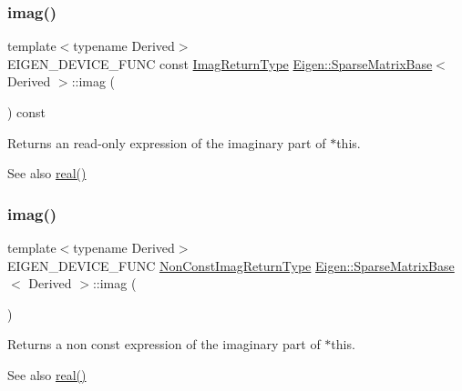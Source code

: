 \subsubsection{\texorpdfstring{imag()}{imag()}\hspace{0.1cm}{\footnotesize\ttfamily [1/2]}}
{\footnotesize\ttfamily template$<$typename Derived$>$ \\
E\+I\+G\+E\+N\+\_\+\+D\+E\+V\+I\+C\+E\+\_\+\+F\+U\+NC const \mbox{\hyperlink{class_eigen_1_1_cwise_unary_op}{Imag\+Return\+Type}} \mbox{\hyperlink{class_eigen_1_1_sparse_matrix_base}{Eigen\+::\+Sparse\+Matrix\+Base}}$<$ Derived $>$\+::imag (\begin{DoxyParamCaption}{ }\end{DoxyParamCaption}) const\hspace{0.3cm}{\ttfamily [inline]}}

\begin{DoxyReturn}{Returns}
an read-\/only expression of the imaginary part of {\ttfamily $\ast$this}.
\end{DoxyReturn}
\begin{DoxySeeAlso}{See also}
\mbox{\hyperlink{class_eigen_1_1_sparse_matrix_base_a47a21ed23d5d10618ac0aca93903a32e}{real()}} 
\end{DoxySeeAlso}
\mbox{\label{class_eigen_1_1_sparse_matrix_base_aba4d0025dccf8a02d33b76c241e0625a}} 
\subsubsection{\texorpdfstring{imag()}{imag()}\hspace{0.1cm}{\footnotesize\ttfamily [2/2]}}
{\footnotesize\ttfamily template$<$typename Derived$>$ \\
E\+I\+G\+E\+N\+\_\+\+D\+E\+V\+I\+C\+E\+\_\+\+F\+U\+NC \mbox{\hyperlink{class_eigen_1_1_cwise_unary_view}{Non\+Const\+Imag\+Return\+Type}} \mbox{\hyperlink{class_eigen_1_1_sparse_matrix_base}{Eigen\+::\+Sparse\+Matrix\+Base}}$<$ Derived $>$\+::imag (\begin{DoxyParamCaption}{ }\end{DoxyParamCaption})\hspace{0.3cm}{\ttfamily [inline]}}

\begin{DoxyReturn}{Returns}
a non const expression of the imaginary part of {\ttfamily $\ast$this}.
\end{DoxyReturn}
\begin{DoxySeeAlso}{See also}
\mbox{\hyperlink{class_eigen_1_1_sparse_matrix_base_a47a21ed23d5d10618ac0aca93903a32e}{real()}} 
\end{DoxySeeAlso}
\mbox{\label{class_eigen_1_1_sparse_matrix_base_a180fcba1ccf3cdf3252a263bc1de7a1d}} 
